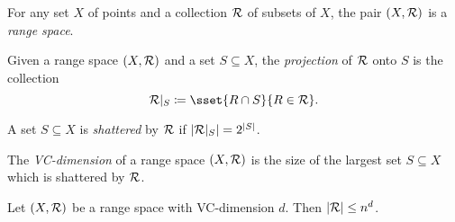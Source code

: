 \chapter{}

\begin{definition} \label{def:range-space}
    For any set $X$ of points and a collection $\mathcal{R}$ of subsets of $X$,
    the pair $(X, \mathcal{R})$ is a \emph{range space}.
\end{definition}

\begin{definition}[Projection] \label{def:projection}
    Given a range space $(X, \mathcal{R})$ and a set $S \subseteq X$, the
    \emph{projection} of $\mathcal{R}$ onto $S$ is the collection \[
        \mcR\vert_S \coloneq \sset{R \cap S}{R \in \mcR}.
    \]
\end{definition}

\begin{definition}[Shattering] \label{def:shattering}
    A set $S \subseteq X$ is \emph{shattered} by $\mathcal{R}$ if
    $\lvert\mathcal{R}\vert_S\rvert = 2^{\lvert S\rvert}$.
\end{definition}

\begin{definition}[VC-dimension] \label{def:vc-dimension}
    The \emph{VC-dimension} of a range space $(X, \mathcal{R})$ is the size of the
    largest set $S \subseteq X$ which is shattered by $\mathcal{R}$.
\end{definition}

\begin{theorem} \label{thm:sauer-shelah}
    Let $(X, \mathcal{R})$ be a range space with VC-dimension $d$.
    Then $\lvert\mathcal{R}\rvert \le n^d$.
\end{theorem}
